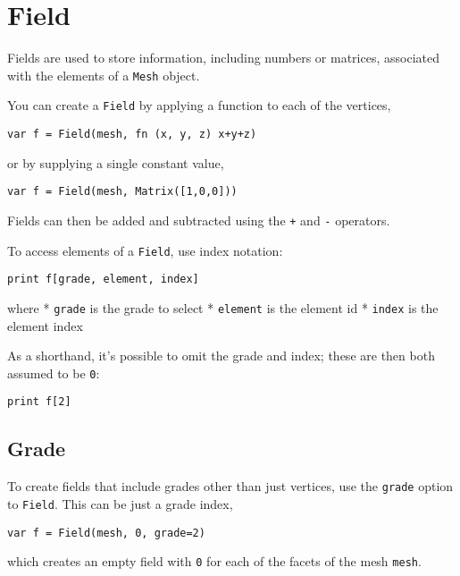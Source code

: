\hypertarget{field}{%
\section{Field}\label{field}}

Fields are used to store information, including numbers or matrices,
associated with the elements of a \texttt{Mesh} object.

You can create a \texttt{Field} by applying a function to each of the
vertices,

\begin{lstlisting}
var f = Field(mesh, fn (x, y, z) x+y+z)
\end{lstlisting}

or by supplying a single constant value,

\begin{lstlisting}
var f = Field(mesh, Matrix([1,0,0]))
\end{lstlisting}

Fields can then be added and subtracted using the \texttt{+} and
\texttt{-} operators.

To access elements of a \texttt{Field}, use index notation:

\begin{lstlisting}
print f[grade, element, index]
\end{lstlisting}

where * \texttt{grade} is the grade to select * \texttt{element} is the
element id * \texttt{index} is the element index

As a shorthand, it's possible to omit the grade and index; these are
then both assumed to be \texttt{0}:

\begin{lstlisting}
print f[2]
\end{lstlisting}

\hypertarget{grade}{%
\subsection{Grade}\label{grade}}

To create fields that include grades other than just vertices, use the
\texttt{grade} option to \texttt{Field}. This can be just a grade index,

\begin{lstlisting}
var f = Field(mesh, 0, grade=2)
\end{lstlisting}

which creates an empty field with \texttt{0} for each of the facets of
the mesh \texttt{mesh}.

